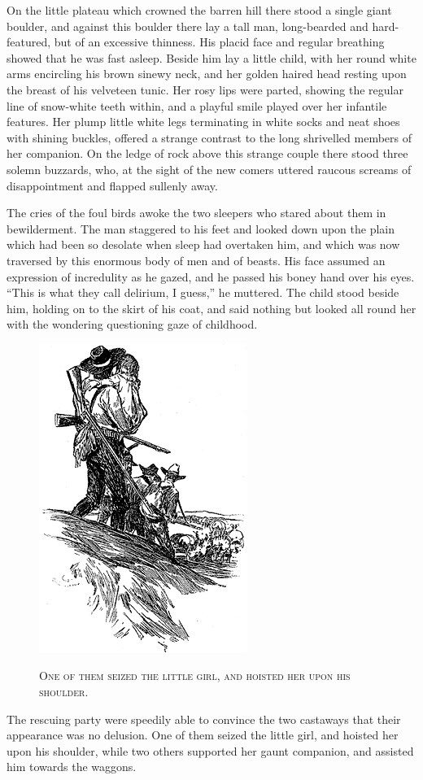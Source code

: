 \documentclass[12pt,english]{book}
\newcommand{\noun}[1]{\textsc{#1}}
\begin{document}
On the little plateau which crowned the barren hill there stood a
single giant boulder, and against this boulder there lay a tall man,
long-bearded and hard-featured, but of an excessive thinness. His
placid face and regular breathing showed that he was fast asleep.
Beside him lay a little child, with her round white arms encircling
his brown sinewy neck, and her golden haired head resting upon the
breast of his velveteen tunic. Her rosy lips were parted, showing
the regular line of snow-white teeth within, and a playful smile played
over her infantile features. Her plump little white legs terminating
in white socks and neat shoes with shining buckles, offered a strange
contrast to the long shrivelled members of her companion. On the ledge
of rock above this strange couple there stood three solemn buzzards,
who, at the sight of the new comers uttered raucous screams of disappointment
and flapped sullenly away.

The cries of the foul birds awoke the two sleepers who stared about
them in bewilderment. The man staggered to his feet and looked down
upon the plain which had been so desolate when sleep had overtaken
him, and which was now traversed by this enormous body of men and
of beasts. His face assumed an expression of incredulity as he gazed,
and he passed his boney hand over his eyes. {}``This is what they
call delirium, I guess,'' he muttered. The child stood beside him,
holding on to the skirt of his coat, and said nothing but looked all
round her with the wondering questioning gaze of childhood.

%
\begin{figure}[htbp]
\noindent \begin{center}\includegraphics{images/study10-stud-15.png}\end{center}

\noindent \begin{center}\noun{One of them seized the little girl,
and hoisted her upon his shoulder.}\end{center}
\end{figure}
The rescuing party were speedily able to convince the two castaways
that their appearance was no delusion. One of them seized the little
girl, and hoisted her upon his shoulder, while two others supported
her gaunt companion, and assisted him towards the waggons.
\end{document}
